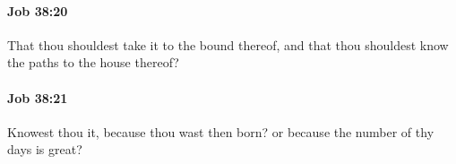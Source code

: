 		\paragraph{Job 38:20} %
			\label{JOB-38-20}

			That thou shouldest take it to the bound thereof, and that thou shouldest know the paths to the house thereof?


		\paragraph{Job 38:21} %
			\label{JOB-38-21}

			Knowest thou it, because thou wast then born? or because the number of thy days is great?


